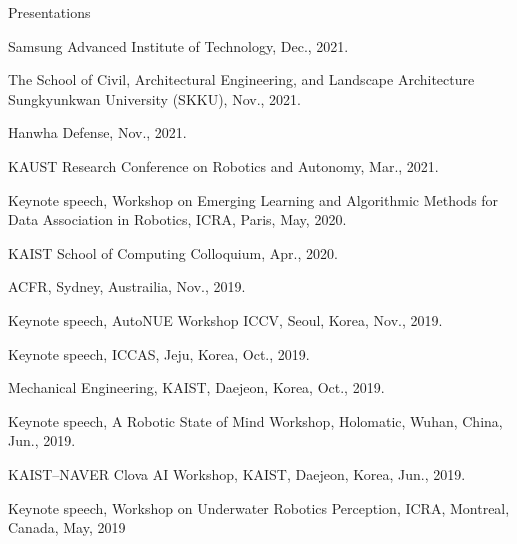 \begin{rSection}{Presentations}
\begin{pubSubsectionNum}{}
  \item Samsung Advanced Institute of Technology, Dec., 2021.

  \item The School of Civil, Architectural Engineering, and Landscape Architecture
Sungkyunkwan University (SKKU), Nov., 2021.

  \item Hanwha Defense, Nov., 2021.



  \item KAUST Research Conference on Robotics and Autonomy, Mar., 2021.


  \item Keynote speech, Workshop on Emerging Learning and Algorithmic Methods for Data Association in Robotics, ICRA, Paris, May, 2020.

  \item KAIST School of Computing Colloquium, Apr., 2020.


  \item \ac{ACFR}, Sydney, Austrailia, Nov., 2019.

  \item Keynote speech, AutoNUE Workshop \ac{ICCV}, Seoul, Korea,  Nov., 2019.

  \item Keynote speech, \ac{ICCAS}, Jeju, Korea, Oct., 2019.

  \item Mechanical Engineering, \ac{KAIST}, Daejeon, Korea, Oct., 2019.

  \item Keynote speech, A Robotic State of Mind Workshop, Holomatic, Wuhan, China, Jun., 2019.

  \item KAIST--NAVER Clova AI Workshop, \ac{KAIST}, Daejeon, Korea, Jun., 2019.

  \item Keynote speech, Workshop on Underwater Robotics Perception, ICRA, Montreal, Canada, May, 2019


\end{pubSubsectionNum}
\end{rSection}
